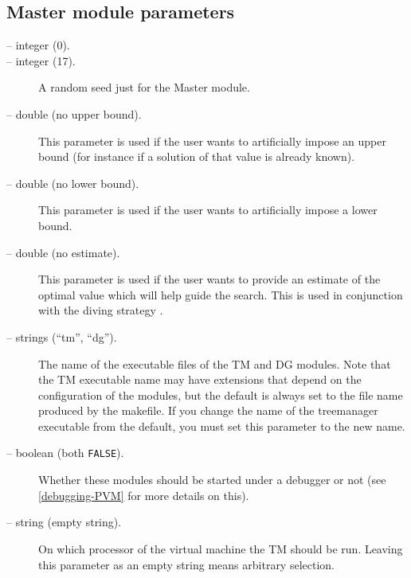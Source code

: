 \subsection{Master module parameters}
\begin{description}

\item[ -- integer (0).] 

\item[ -- integer (17).]
A random seed just for the Master module.

\item[ -- double (no upper bound).] 
This parameter is used if the user wants to artificially impose an
upper bound (for instance if a solution of that value is already
known).

\item[ -- double (no lower bound).] 
This parameter is used if the user wants to artificially impose a
lower bound.

\label{upper_bound_estimate}
\item[ -- double (no estimate).] 
This parameter is used if the user wants to provide an estimate of the
optimal value which will help guide the search. This is used in
conjunction with the diving strategy .

\item[ -- strings (``tm'', ``dg'').] 
The name of the executable files of the TM and DG modules. Note that
the TM executable name may have extensions that depend on the
configuration of the modules, but the default is always set to the
file name produced by the makefile. If you change the name of the
treemanager executable from the default, you must set this parameter
to the new name.

\item[ -- boolean (both {\tt FALSE}).] 
Whether these modules should be started under a debugger or not (see
\ref{debugging-PVM} for more details on this).

\item[ -- string (empty string).] 
On which processor of the virtual machine the TM should be run. Leaving this
parameter as an empty string means arbitrary selection.


\end{description}
